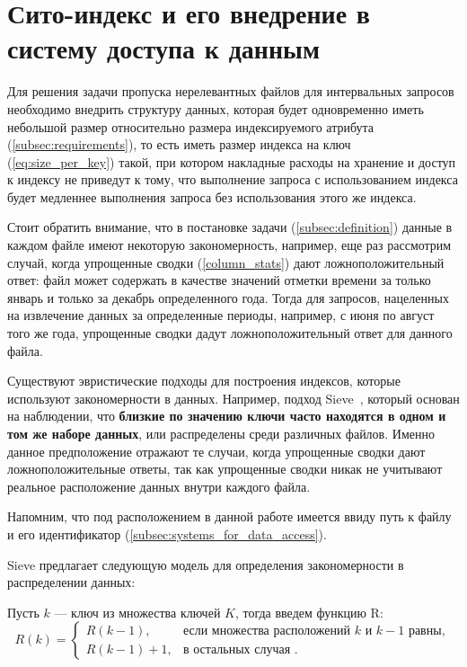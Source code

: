 \section{Сито-индекс и его внедрение в систему доступа к данным}

Для решения задачи пропуска нерелевантных файлов для интервальных запросов необходимо внедрить структуру данных, которая будет одновременно иметь небольшой размер относительно размера индексируемого атрибута (\ref{subsec:requirements}), то есть иметь размер индекса на ключ (\ref{eq:size_per_key}) такой, при котором накладные расходы на хранение и доступ к индексу не приведут к тому, что выполнение запроса с использованием индекса будет медленнее выполнения запроса без использования этого же индекса.

Стоит обратить внимание, что в постановке задачи (\ref{subsec:definition}) данные в каждом файле имеют некоторую закономерность, например, еще раз рассмотрим случай, когда упрощенные сводки (\ref{column_stats}) дают ложноположительный ответ: файл может содержать в качестве значений отметки времени за только январь и только за декабрь определенного года.
Тогда для запросов, нацеленных на извлечение данных за определенные периоды, например, с июня по август того же года, упрощенные сводки дадут ложноположительный ответ для данного файла.

Существуют эвристические подходы для построения индексов, которые используют закономерности в данных.
Например, подход Sieve~\cite{Sieve}, который основан на наблюдении, что \textbf{близкие по значению ключи часто находятся в одном и том же наборе данных}, или распределены среди различных файлов.
Именно данное предположение отражают те случаи, когда упрощенные сводки дают ложноположительные ответы, так как упрощенные сводки никак не учитывают реальное расположение данных внутри каждого файла.

Напомним, что под расположением в данной работе имеется ввиду путь к файлу и его идентификатор (\ref{subsec:systems_for_data_access}).

Sieve предлагает следующую модель для определения закономерности в распределении данных:

Пусть $k$ --- ключ из множества ключей $K$, тогда введем функцию R:
\begin{equation}\label{R_CDF}
R(k) = 
\begin{cases} 
    R(k - 1), & \text{если множества расположений $k$ и $k - 1$ равны}, \\
    R(k - 1) + 1, & \text{в остальных случая }.
\end{cases}
\end{equation}

